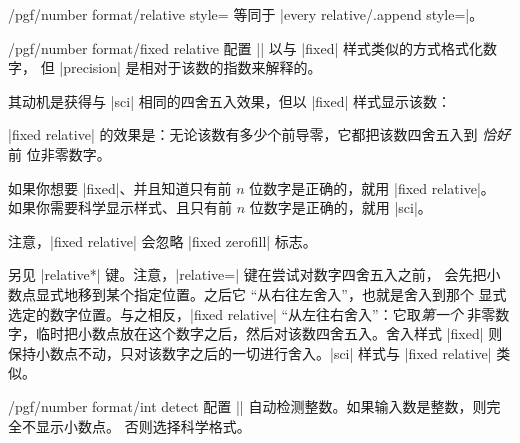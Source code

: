 \documentclass[a4paper,doc2]{ltxdoc}
\begin{document}
\begin{key}{/pgf/number format/relative style=}
    等同于 |every relative/.append style=|。
\end{key}

\begin{keylist}{/pgf/number format/fixed relative}
    配置 |\pgfmathprintnumber| 以与 |fixed| 样式类似的方式格式化数字，
    但 |precision| 是相对于该数的指数来解释的。

    其动机是获得与 |sci| 相同的四舍五入效果，但以 |fixed| 样式显示该数：
\begin{codeexample}[]
\hspace{1em}
\hspace{1em}
\hspace{1em}
\hspace{1em}
\hspace{1em}
\hspace{1em}
\hspace{1em}
\end{codeexample}

    |fixed relative| 的效果是：无论该数有多少个前导零，它都把该数四舍五入到
    \emph{恰好}前  位非零数字。

    如果你想要 |fixed|、并且知道只有前 $n$ 位数字是正确的，就用 |fixed relative|。
    如果你需要科学显示样式、且只有前 $n$ 位数字是正确的，就用 |sci|。

    注意，|fixed relative| 会忽略 |fixed zerofill| 标志。

    另见 |relative*| 键。注意，|relative=| 键在尝试对数字四舍五入之前，
    会先把小数点显式地移到某个指定位置。之后它 ``从右往左舍入''，也就是舍入到那个
    显式选定的数字位置。与之相反，|fixed relative| ``从左往右舍入''：它取\emph{第一个}
    非零数字，临时把小数点放在这个数字之后，然后对该数四舍五入。舍入样式 |fixed|
    则保持小数点不动，只对该数字之后的一切进行舍入。|sci| 样式与 |fixed relative| 类似。
\end{keylist}

\begin{key}{/pgf/number format/int detect}
    配置 |\pgfmathprintnumber| 自动检测整数。如果输入数是整数，则完全不显示小数点。
    否则选择科学格式。

\begin{codeexample}[]
\hspace{1em}
\hspace{1em}
\hspace{1em}
\hspace{1em}
\end{codeexample}
\end{key}
\end{document}

